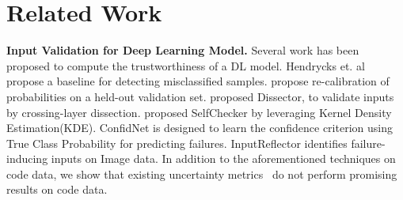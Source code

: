\section{Related Work}
\label{related}
\textbf{Input Validation for Deep Learning Model.} %
Several work has been proposed to compute the trustworthiness of a DL model. Hendrycks et. al~\cite{hendrycks2018baseline} propose a baseline for detecting misclassified samples. \cite{guo2017calibration} propose re-calibration of probabilities on a held-out validation set. \cite{wang2020dissector} proposed Dissector, to validate inputs by crossing-layer dissection. 
\cite{xiao2021selfchecking} proposed SelfChecker by leveraging Kernel Density Estimation(KDE)\cite{terrell1992variable}. ConfidNet\cite{corbiere2019addressing} is designed to learn the confidence criterion using True Class Probability for predicting failures. InputReflector \cite{xiao2022repairing} identifies failure-inducing inputs on Image data. In addition to the aforementioned techniques on code data, we show that existing uncertainty metrics~\cite{guo2017calibration,wang2020dissector,hendrycks2018baseline, li2021estimating, alon2019code2vec, vasudevan2019towards,corbiere2019addressing} do not perform promising results on code data.  


   

